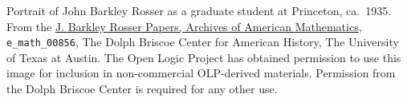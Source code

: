 Portrait of John Barkley Rosser as a graduate student at Princeton,
ca.~1935. From
the \href{http://www.cah.utexas.edu/collections/math.php}{J. Barkley
Rosser Papers, Archives of American Mathematics}, \verb|e_math_00856|, The
Dolph Briscoe Center for American History, The University of Texas at
Austin. The Open Logic Project has obtained permission to use this
image for inclusion in non-commercial OLP-derived materials.
Permission from the Dolph Briscoe Center is required for any other
use.
